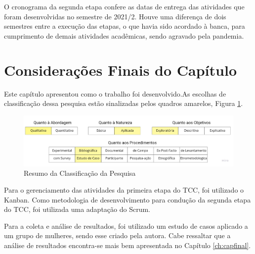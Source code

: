 O cronograma da segunda etapa confere as datas de entrega das atividades 
que foram desenvolvidas no semestre de 2021/2. Houve uma diferença de dois semestres entre a execução das etapas, 
o que havia sido acordado à banca, para cumprimento de demais atividades acadêmicas, sendo agravado pela pandemia.

\section{Considerações Finais do Capítulo}

Este capítulo apresentou como o trabalho foi desenvolvido.As escolhas de classificação dessa pesquisa estão sinalizadas pelos quadros amarelos, Figura \ref{fig06}.

\begin{figure}[htbp]
	\caption{Resumo da Classificação da Pesquisa}
	\begin{center}
	\includegraphics[keepaspectratio=true,scale=0.28]{figuras/resumoAbordagem.pdf}
	\end{center}
    \label{fig06}
\end{figure}

Para o gerenciamento das atividades da primeira etapa do TCC, foi utilizado o Kanban. Como metodologia de desenvolvimento 
para condução da segunda etapa do TCC, foi utilizada uma adaptação do Scrum.

Para a coleta e análise de resultados, foi utilizado um estudo 
de casos aplicado a um grupo de mulheres, sendo esse criado pela 
autora. Cabe ressaltar que a análise de resultados encontra-se mais bem apresentada no Capítulo \ref{ch:capfinal}.



